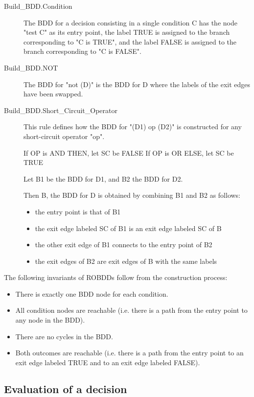 \documentclass[a4paper,12pt,twoside]{article}
\begin{document}
\begin{description}
\item[Build\_BDD.Condition]
  The BDD for a decision consisting in a single condition C has the node
  "test C" as its entry point, the label TRUE is assigned to the branch
  corresponding to "C is TRUE", and the label FALSE is assigned to the
  branch corresponding to "C is FALSE".

\item[Build\_BDD.NOT]
  The BDD for "not (D)" is the BDD for D where the labels of the exit
  edges have been swapped.

\item[Build\_BDD.Short\_Circuit\_Operator]
  This rule defines how the BDD for "(D1) op (D2)" is constructed for
  any short-circuit operator "op".

  If OP is AND THEN, let SC be FALSE
  If OP is OR ELSE, let SC be TRUE

  Let B1 be the BDD for D1, and B2 the BDD for D2.

  Then B, the BDD for D is obtained by combining B1 and B2 as follows:
  \begin{itemize}
    \item the entry point is that of B1
    \item the exit edge labeled SC of B1 is an exit edge labeled SC of B
    \item the other exit edge of B1 connects to the entry point of B2
    \item the exit edges of B2 are exit edges of B with the same labels
  \end{itemize}
\end{description}

The following invariants of ROBDDs follow from the construction process:
\begin{itemize}
  \item There is exactly one BDD node for each condition.
  \item All condition nodes are reachable (i.e. there is a path from
        the entry point to any node in the BDD).
  \item There are no cycles in the BDD.
  \item Both outcomes are reachable (i.e. there is a path from the entry point
        to an exit edge labeled TRUE and to an exit edge labeled FALSE).
\end{itemize}

\subsection{Evaluation of a decision}
\end{document}
